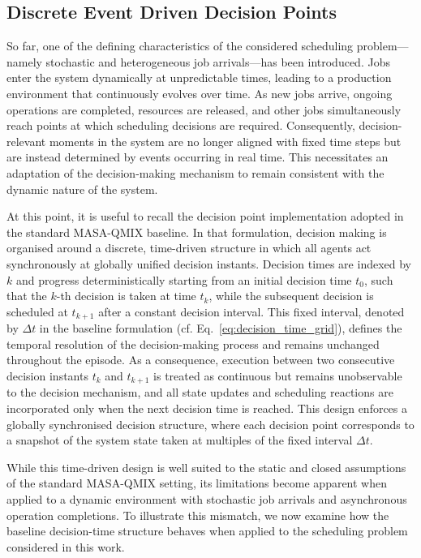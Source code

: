 \subsection{Discrete Event Driven Decision Points}
\label{sec:discerete_event}
So far, one of the defining characteristics of the considered scheduling problem—namely stochastic and heterogeneous job arrivals—has been introduced. Jobs enter the system dynamically at unpredictable times, leading to a production environment that continuously evolves over time. As new jobs arrive, ongoing operations are completed, resources are released, and other jobs simultaneously reach points at which scheduling decisions are required. Consequently, decision-relevant moments in the system are no longer aligned with fixed time steps but are instead determined by events occurring in real time. This necessitates an adaptation of the decision-making mechanism to remain consistent with the dynamic nature of the system.

At this point, it is useful to recall the decision point implementation adopted in the standard MASA-QMIX baseline. In that formulation, decision making is organised around a discrete, time-driven structure in which all agents act synchronously at globally unified decision instants. Decision times are indexed by $k$ and progress deterministically starting from an initial decision time $t_0$, such that the $k$-th decision is taken at time $t_k$, while the subsequent decision is scheduled at $t_{k+1}$ after a constant decision interval. This fixed interval, denoted by $\Delta t$ in the baseline formulation (cf. Eq.~\eqref{eq:decision_time_grid}), defines the temporal resolution of the decision-making process and remains unchanged throughout the episode. As a consequence, execution between two consecutive decision instants $t_k$ and $t_{k+1}$ is treated as continuous but remains unobservable to the decision mechanism, and all state updates and scheduling reactions are incorporated only when the next decision time is reached. This design enforces a globally synchronised decision structure, where each decision point corresponds to a snapshot of the system state taken at multiples of the fixed interval $\Delta t$.

While this time-driven design is well suited to the static and closed assumptions of the standard MASA-QMIX setting, its limitations become apparent when applied to a dynamic environment with stochastic job arrivals and asynchronous operation completions. To illustrate this mismatch, we now examine how the baseline decision-time structure behaves when applied to the scheduling problem considered in this work.

